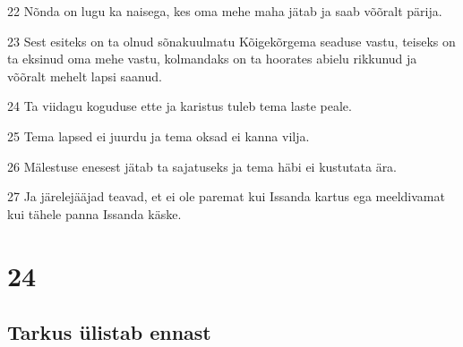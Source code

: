 \par 22 Nõnda on lugu ka naisega, kes oma mehe maha jätab ja saab võõralt pärija.
\par 23 Sest esiteks on ta olnud sõnakuulmatu Kõigekõrgema seaduse vastu, teiseks on ta eksinud oma mehe vastu, kolmandaks on ta hoorates abielu rikkunud ja võõralt mehelt lapsi saanud.
\par 24 Ta viidagu koguduse ette ja karistus tuleb tema laste peale.
\par 25 Tema lapsed ei juurdu ja tema oksad ei kanna vilja.
\par 26 Mälestuse enesest jätab ta sajatuseks ja tema häbi ei kustutata ära.
\par 27 Ja järelejääjad teavad, et ei ole paremat kui Issanda kartus ega meeldivamat kui tähele panna Issanda käske.

\chapter{24}

\section*{Tarkus ülistab ennast}

